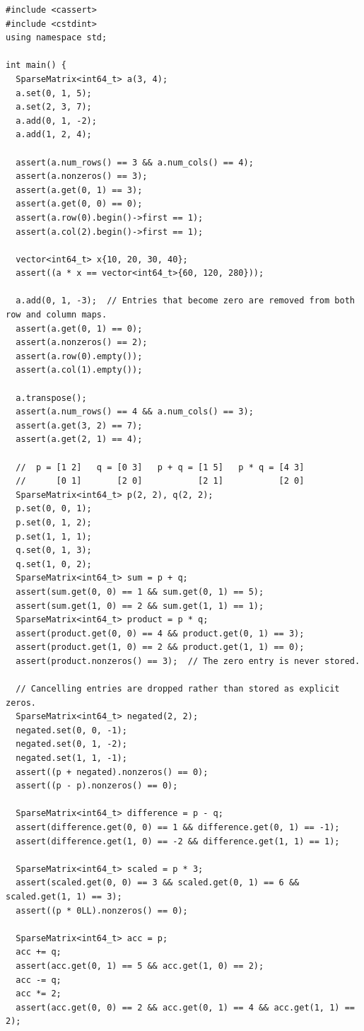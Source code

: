 \begin{lstlisting}[style=cpp]
#include <cassert>
#include <cstdint>
using namespace std;

int main() {
  SparseMatrix<int64_t> a(3, 4);
  a.set(0, 1, 5);
  a.set(2, 3, 7);
  a.add(0, 1, -2);
  a.add(1, 2, 4);

  assert(a.num_rows() == 3 && a.num_cols() == 4);
  assert(a.nonzeros() == 3);
  assert(a.get(0, 1) == 3);
  assert(a.get(0, 0) == 0);
  assert(a.row(0).begin()->first == 1);
  assert(a.col(2).begin()->first == 1);

  vector<int64_t> x{10, 20, 30, 40};
  assert((a * x == vector<int64_t>{60, 120, 280}));

  a.add(0, 1, -3);  // Entries that become zero are removed from both row and column maps.
  assert(a.get(0, 1) == 0);
  assert(a.nonzeros() == 2);
  assert(a.row(0).empty());
  assert(a.col(1).empty());

  a.transpose();
  assert(a.num_rows() == 4 && a.num_cols() == 3);
  assert(a.get(3, 2) == 7);
  assert(a.get(2, 1) == 4);

  //  p = [1 2]   q = [0 3]   p + q = [1 5]   p * q = [4 3]
  //      [0 1]       [2 0]           [2 1]           [2 0]
  SparseMatrix<int64_t> p(2, 2), q(2, 2);
  p.set(0, 0, 1);
  p.set(0, 1, 2);
  p.set(1, 1, 1);
  q.set(0, 1, 3);
  q.set(1, 0, 2);
  SparseMatrix<int64_t> sum = p + q;
  assert(sum.get(0, 0) == 1 && sum.get(0, 1) == 5);
  assert(sum.get(1, 0) == 2 && sum.get(1, 1) == 1);
  SparseMatrix<int64_t> product = p * q;
  assert(product.get(0, 0) == 4 && product.get(0, 1) == 3);
  assert(product.get(1, 0) == 2 && product.get(1, 1) == 0);
  assert(product.nonzeros() == 3);  // The zero entry is never stored.

  // Cancelling entries are dropped rather than stored as explicit zeros.
  SparseMatrix<int64_t> negated(2, 2);
  negated.set(0, 0, -1);
  negated.set(0, 1, -2);
  negated.set(1, 1, -1);
  assert((p + negated).nonzeros() == 0);
  assert((p - p).nonzeros() == 0);

  SparseMatrix<int64_t> difference = p - q;
  assert(difference.get(0, 0) == 1 && difference.get(0, 1) == -1);
  assert(difference.get(1, 0) == -2 && difference.get(1, 1) == 1);

  SparseMatrix<int64_t> scaled = p * 3;
  assert(scaled.get(0, 0) == 3 && scaled.get(0, 1) == 6 && scaled.get(1, 1) == 3);
  assert((p * 0LL).nonzeros() == 0);

  SparseMatrix<int64_t> acc = p;
  acc += q;
  assert(acc.get(0, 1) == 5 && acc.get(1, 0) == 2);
  acc -= q;
  acc *= 2;
  assert(acc.get(0, 0) == 2 && acc.get(0, 1) == 4 && acc.get(1, 1) == 2);


\end{lstlisting}
